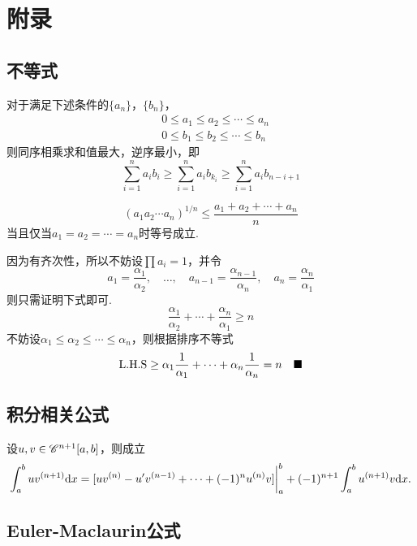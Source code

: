 \newpage
\section{附录}
\subsection{不等式}

  \begin{lemma}[排序不等式]
    \label{lemma: 排序不等式}
    对于满足下述条件的$\{a_n\}$，$\{b_n\}$，
    \[\begin{split}
      & 0 \le a_1\le a_2\le\cdots\le a_n \\
      & 0 \le b_1\le b_2\le\cdots\le b_n
    \end{split}\]
    则同序相乘求和值最大，逆序最小，即
    \[
      \sum_{i=1}^n a_ib_i \ge \sum_{i=1}^n a_ib_{k_i}
      \ge \sum_{i=1}^n a_ib_{n-i+1}
    \]
  \end{lemma}

  \begin{lemma}[算数-几何均值不等式]
    \[
      (a_1a_2\cdots a_n)^{1/n} \le \frac{a_1+a_2+\cdots+a_n}{n}
    \]
    当且仅当$a_1 = a_2 = \cdots = a_n$时等号成立.
  \end{lemma}
  \proof
    因为有齐次性，所以不妨设$\prod a_i=1$，并令
    \[
      a_1=\frac{\alpha_1}{\alpha_2},\quad
      \dots,\quad
      a_{n-1} = \frac{\alpha_{n-1}}{\alpha_n},\quad
      a_n = \frac{\alpha_n}{\alpha_1}
    \]
    则只需证明下式即可.
    \[
      \frac{\alpha_1}{\alpha_2} + \cdots + \frac{\alpha_n}{\alpha_1}
      \ge n
    \]
    不妨设$\alpha_1 \le \alpha_2 \le \cdots \le \alpha_n$，则根据排序不等式
    \[
      \text{L.H.S} \ge \alpha_1\frac{1}{\alpha_1} + \cdots + \alpha_n\frac{1}{\alpha_n}
       = n \quad\blacksquare
    \]

\newpage
\subsection{积分相关公式}
  \begin{lemma}[分部积分]
    设$u,v\in\mathscr{C}^{n+1}[a, b]$，则成立
    \[
      \int_a^buv^{(n+1)}\mathrm{d} x =
      [ uv^{(n)} - u^\prime v^{(n-1)} + \cdots +  (-1)^nu^{(n)}v]
      \bigg\vert_a^b + (-1)^{n+1}\int_a^bu^{(n+1)}v\mathrm{d} x.
    \]
  \end{lemma}

\newpage
\subsection{Euler-Maclaurin公式}
